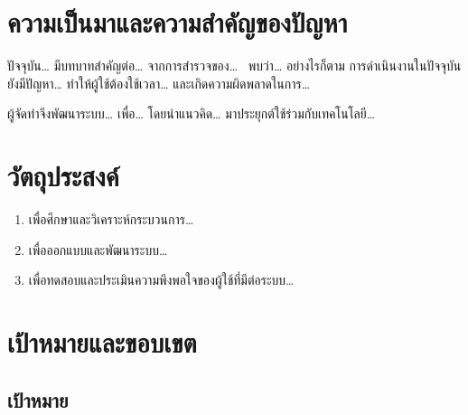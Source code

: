 
\section{ความเป็นมาและความสำคัญของปัญหา}
\label{sec:background}


ปัจจุบัน\ldots{} มีบทบาทสำคัญต่อ\ldots{} จากการสำรวจของ\ldots{}~\cite{thesismgmt2023}
พบว่า\ldots{} อย่างไรก็ตาม การดำเนินงานในปัจจุบันยังมีปัญหา\ldots{}
ทำให้ผู้ใช้ต้องใช้เวลา\ldots{} และเกิดความผิดพลาดในการ\ldots{}

ผู้จัดทำจึงพัฒนาระบบ\ldots{} เพื่อ\ldots{} โดยนำแนวคิด\ldots{}
มาประยุกต์ใช้ร่วมกับเทคโนโลยี\ldots{}

\section{วัตถุประสงค์}
\label{sec:objectives}


\begin{enumerate}
  \item เพื่อศึกษาและวิเคราะห์กระบวนการ\ldots{}
  \item เพื่อออกแบบและพัฒนาระบบ\ldots{}
  \item เพื่อทดสอบและประเมินความพึงพอใจของผู้ใช้ที่มีต่อระบบ\ldots{}
\end{enumerate}

\section{เป้าหมายและขอบเขต}
\label{sec:scope}

\subsection{เป้าหมาย}


